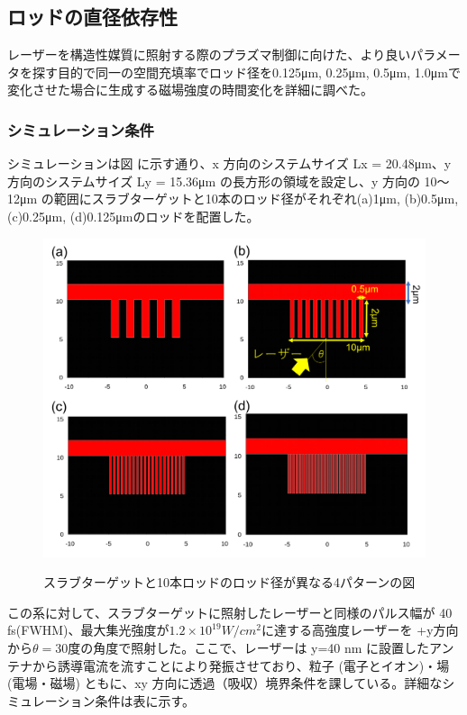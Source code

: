 \documentclass[a4paper,11pt,titlepage]{jarticle}
\numberwithin{equation}{section} %
\begin{document}
  \subsection{ロッドの直径依存性}
  レーザーを構造性媒質に照射する際のプラズマ制御に向けた、より良いパラメータを探す目的で同一の空間充填率でロッド径を0.125μm, 0.25μm, 0.5μm, 1.0μmで変化させた場合に生成する磁場強度の時間変化を詳細に調べた。
  
  \subsubsection{シミュレーション条件}
  シミュレーションは図 に示す通り、x 方向のシステムサイズ Lx = 20.48μm、y 方向のシステムサイズ Ly = 15.36μm の長方形の領域を設定し、y 方向の 10～12μm の範囲にスラブターゲットと10本のロッド径がそれぞれ(a)1μm, (b)0.5μm, (c)0.25μm, (d)0.125μmのロッドを配置した。
  
  \begin{figure}[H]
    \begin{center}
      \includegraphics[scale=0.6]{./image/4-12-10rod_4.png}
      \label{fig:4-8-2}
      \caption{スラブターゲットと10本ロッドのロッド径が異なる4パターンの図}
    \end{center}
  \end{figure}
  
  この系に対して、スラブターゲットに照射したレーザーと同様のパルス幅が 40 fs(FWHM)、最大集光強度が$1.2×10^{19}W/cm^2$に達する高強度レーザーを +y方向から$\theta=$30度の角度で照射した。ここで、レーザーは y=40 nm に設置したアンテナから誘導電流を流すことにより発振させており、粒子 (電子とイオン)・場 (電場・磁場) ともに、xy 方向に透過（吸収）境界条件を課している。詳細なシミュレーション条件は表に示す。
  
\end{document}
